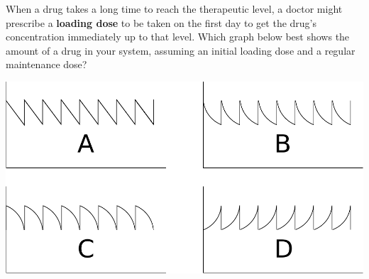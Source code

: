 \documentclass{ximera}
\begin{document}
\begin{question}
When a drug takes a long time to reach the therapeutic level, a doctor
might prescribe a \textbf{loading dose} to be taken on the first day
to get the drug's concentration immediately up to that level. Which
graph below best shows the amount of a drug in your system, assuming
an initial loading dose and a regular maintenance dose?
\begin{image}
  \includegraphics{plots.pdf}
\end{image}
\begin{multipleChoice}
\end{multipleChoice}
\end{question}



\end{document}
